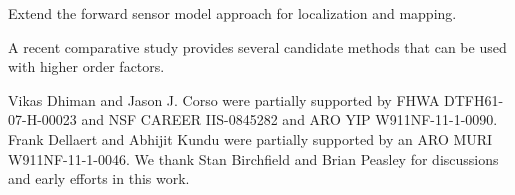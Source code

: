 \documentclass[final]{beamer}
\begin{document}
\begin{multicols}{3}
    \begin{packedEnumerate}
      \item Extend the forward sensor model approach for localization and mapping.
      \item A recent comparative study \cite{kappes2013comparative} provides
        several candidate methods that can be used with higher order factors.
    \end{packedEnumerate}



    Vikas Dhiman and Jason J. Corso were partially supported by FHWA
    DTFH61-07-H-00023 and NSF CAREER IIS-0845282 and ARO YIP W911NF-11-1-0090.
    Frank Dellaert and Abhijit Kundu
    were partially supported by an ARO MURI W911NF-11-1-0046.
    We thank Stan
    Birchfield and Brian Peasley for discussions and early efforts in this
    work.


    {\onehalfspacing\scriptsize
      
      }

    \addegssponsors

  \end{multicols}

\end{document}
